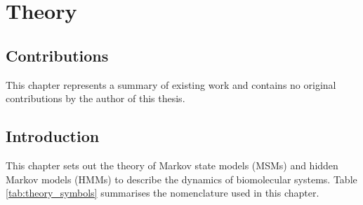 %
\let\textcircled=\pgftextcircled
\chapter{Theory}
\label{chap:theory}

\section*{Contributions}\label{sec:theory_contributions}
This chapter represents a summary of existing work and contains no original contributions by the author of this thesis. 

\section{Introduction}
This chapter sets out the theory of Markov state models (MSMs) and hidden Markov models (HMMs) to describe the dynamics of biomolecular systems. Table \ref{tab:theory_symbols} summarises the  nomenclature used in this chapter. 

